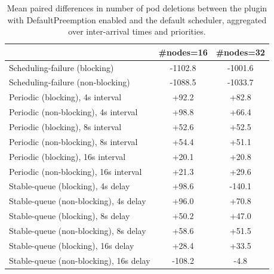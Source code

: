 \begin{table}[t]
\tiny
\setlength{\tabcolsep}{1.2pt}
\renewcommand{\arraystretch}{1.12}
\centering
\caption{Mean paired differences in number of pod deletions between the plugin with DefaultPreemption enabled and the default scheduler, aggregated over inter-arrival times and priorities.}
\label{tab:deletions-defpreempt1-std0-agg-arrival-prio}
\begin{tabular}{l c c}
\toprule
 & \#nodes=16 & \#nodes=32 \\
\midrule
Scheduling-failure (blocking) & -1102.8 & -1001.6 \\
Scheduling-failure (non-blocking) & -1088.5 & -1033.7 \\
Periodic (blocking), 4s interval & +92.2 & +82.8 \\
Periodic (non-blocking), 4s interval & +98.8 & +66.4 \\
Periodic (blocking), 8s interval & +52.6 & +52.5 \\
Periodic (non-blocking), 8s interval & +54.4 & +51.1 \\
Periodic (blocking), 16s interval & +20.1 & +20.8 \\
Periodic (non-blocking), 16s interval & +21.3 & +29.6 \\
Stable-queue (blocking), 4s delay & +98.6 & -140.1 \\
Stable-queue (non-blocking), 4s delay & +96.0 & +70.8 \\
Stable-queue (blocking), 8s delay & +50.2 & +47.0 \\
Stable-queue (non-blocking), 8s delay & +58.6 & +51.5 \\
Stable-queue (blocking), 16s delay & +28.4 & +33.5 \\
Stable-queue (non-blocking), 16s delay & -108.2 & -4.8 \\
\bottomrule
\end{tabular}
\end{table}
